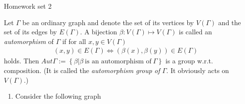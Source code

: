 \documentclass{article}
\begin{document}
\maketitle
Homework set 2 

\pagebreak

\begin{homeworkProblem}
    Let $\Gamma$ be an ordinary graph and denote the set of its 
    vertices by $V(\Gamma)$ and the set of its edges by $E(\Gamma)$.
    A bijection $\beta: V(\Gamma) \mapsto V(\Gamma)$ is
    called an \textit{automorphism} of $\Gamma$ if 
    for all $x,y \in V(\Gamma)$
    \begin{align}
        (x,y) \in E(\Gamma) \iff (\beta(x), \beta(y)) \in E(\Gamma)
    \end{align}
    holds. Then $Aut \Gamma := \left\{ \beta | \beta \ \text{is an automorphism of} \ \Gamma \right\}$
    is a group w.r.t. composition. 
    (It is called the \textit{automorphism group of} $\Gamma$. 
    It obviously acts on $V(\Gamma)$.)
    \begin{enumerate}
        \item Consider the following graph 
    \end{enumerate}
    

    


    
\end{homeworkProblem}

\pagebreak

\begin{homeworkProblem}

    
\end{homeworkProblem}

\pagebreak
\end{document}
